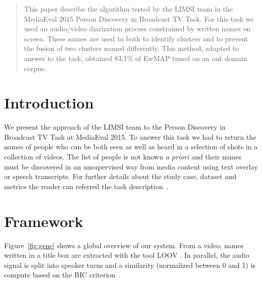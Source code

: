 \documentclass{acm_proc_article-me}
\begin{document}
\maketitle
\begin{abstract}

This paper describe the algorithm tested by the LIMSI team in the MediaEval 2015 Person Discovery in Broadcast TV Task. For this task we used an audio/video diarization process constrained by written names on screen. These names are used to both to identify clusters and to prevent the fusion of two clusters named differently. This method, adapted to answer to the task, obtained 83.1\% of EwMAP tuned on an out domain corpus.

\end{abstract}


\section{Introduction}

We present the approach of the LIMSI team to the Person Discovery in Broadcast TV Task at MediaEval 2015. To answer this task we had to return the names of people who can be both seen as well as heard in a selection of shots in a collection of videos. The list of people is not known \emph{a priori} and their names must be discovered in an unsupervised way from media content using text overlay or speech transcripts. For further details about the study case, dataset and metrics the reader can referred the task description~\cite{POIGNANT--MEDIAEVAL--2015}. 

\section{Framework}

Figure~\ref{fig:gene} shows a global overview of our system. From a video, names written in a title box are extracted with the tool LOOV \cite{POIGNANT--ICME--2012}. In parallel, the audio signal is split into speaker turns and a similarity (normalized between 0 and 1) is compute based on the BIC criterion~\cite{CHEN--DARPA--1998}.
\end{document}
